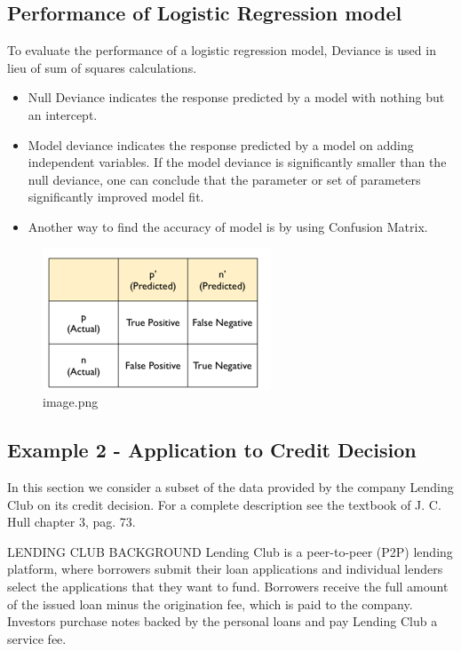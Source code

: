 \documentclass[11pt]{article}
\providecommand{\tightlist}{%
      \setlength{\itemsep}{0pt}\setlength{\parskip}{0pt}}
\begin{document}
    \hypertarget{performance-of-logistic-regression-model}{%
\subsection{Performance of Logistic Regression
model}\label{performance-of-logistic-regression-model}}

To evaluate the performance of a logistic regression model, Deviance is
used in lieu of sum of squares calculations.

\begin{itemize}
\tightlist
\item
  Null Deviance indicates the response predicted by a model with nothing
  but an intercept.
\item
  Model deviance indicates the response predicted by a model on adding
  independent variables. If the model deviance is significantly smaller
  than the null deviance, one can conclude that the parameter or set of
  parameters significantly improved model fit.
\item
  Another way to find the accuracy of model is by using Confusion
  Matrix.
\end{itemize}

    \begin{figure}
\centering
\includegraphics{./pic/chapter-4-1_pic_2.png}
\caption{image.png}
\end{figure}

    \hypertarget{example-2---application-to-credit-decision}{%
\subsection{Example 2 - Application to Credit
Decision}\label{example-2---application-to-credit-decision}}

    In this section we consider a subset of the data provided by the company
Lending Club on its credit decision. For a complete description see the
textbook of J. C. Hull chapter 3, pag. 73.

LENDING CLUB BACKGROUND Lending Club is a peer-to-peer (P2P) lending
platform, where borrowers submit their loan applications and individual
lenders select the applications that they want to fund. Borrowers
receive the full amount of the issued loan minus the origination fee,
which is paid to the company. Investors purchase notes backed by the
personal loans and pay Lending Club a service fee.
\end{document}
